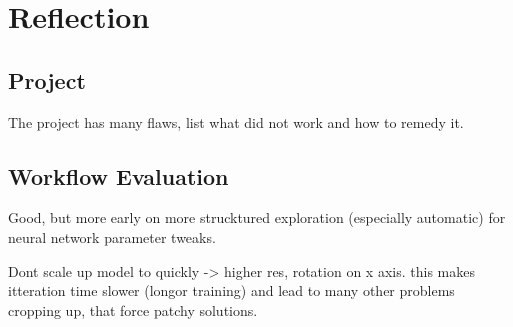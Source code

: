 \chapter{Reflection}
\section{Project}
The project has many flaws, list what did not work and how to remedy it.

\section{Workflow Evaluation}
Good, but more early on more strucktured exploration (especially automatic) for neural network parameter tweaks.

Dont scale up model to quickly -> higher res, rotation on x axis. this makes itteration time slower (longor training) and lead to many other problems cropping up, that force patchy solutions.
